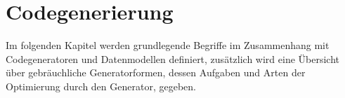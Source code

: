 \chapter{Codegenerierung}
\label{chap:codegeneration}


Im folgenden Kapitel werden grundlegende Begriffe im Zusammenhang mit Codegeneratoren und Datenmodellen definiert, zusätzlich wird eine Übersicht über gebräuchliche Generatorformen, dessen Aufgaben und Arten der Optimierung durch den Generator, gegeben. 





